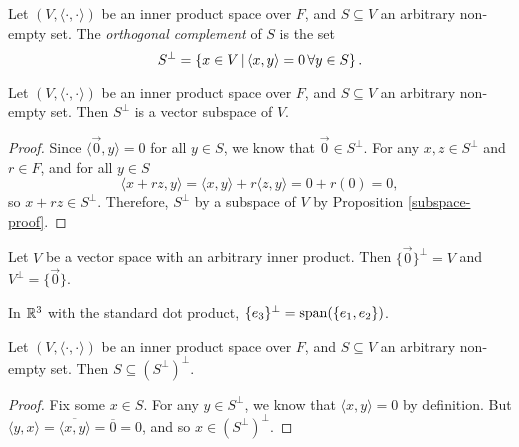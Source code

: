 \begin{defn}
    Let $(V, \langle\cdot,\cdot\rangle)$ be an inner product space over $F$, and $S \subseteq V$ an arbitrary non-empty set. The \emph{orthogonal complement} of $S$ is the set
    \[S^{\perp} = \left\{x \in V \,\middle|\, \langle x, y \rangle = 0 \,\forall y \in S \right\}.\]
\end{defn}

\begin{lemma}\label{orthogonal-complement-is-subspace}
    Let $(V, \langle\cdot,\cdot\rangle)$ be an inner product space over $F$, and $S \subseteq V$ an arbitrary non-empty set. Then $S^{\perp}$ is a vector subspace of $V$.
\end{lemma}

\begin{proof}
    Since $\langle \vec{0}, y \rangle = 0$ for all $y \in S$, we know that $\vec{0} \in S^{\perp}$. For any $x, z \in S^{\perp}$ and $r \in F$, and for all $y \in S$
    \[\langle x + rz, y \rangle = \langle x, y \rangle + r\langle z, y \rangle = 0 + r(0) = 0,\]
    so $x + rz \in S^{\perp}$. Therefore, $S^{\perp}$ by a subspace of $V$ by Proposition \ref{subspace-proof}.
\end{proof}

\begin{exmp}
    Let $V$ be a vector space with an arbitrary inner product. Then $\{\vec{0}\}^{\perp} = V$ and $V^{\perp} = \{\vec{0}\}$.
\end{exmp}

\begin{exmp}
    In $\mathbb{R}^3$ with the standard dot product, $\{e_3\}^{\perp} = \operatorname{span}(\{e_1, e_2\})$.
\end{exmp}

\begin{lemma}\label{orthogonal-complement-of-orthogonal-complement}
    Let $(V, \langle\cdot,\cdot\rangle)$ be an inner product space over $F$, and $S \subseteq V$ an arbitrary non-empty set. Then $S \subseteq \left(S^{\perp}\right)^{\perp}$.
\end{lemma}

\begin{proof}
    Fix some $x \in S$. For any $y \in S^{\perp}$, we know that $\langle x, y \rangle = 0$ by definition. But $\langle y, x \rangle = \overline{\langle x, y \rangle} = \overline{0} = 0$, and so $x \in \left(S^{\perp}\right)^{\perp}$.
\end{proof}

